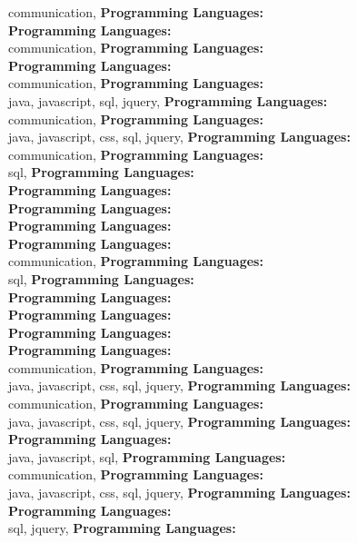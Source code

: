communication, \textbf{Programming Languages:} \\
\textbf{Programming Languages:} \\
communication, \textbf{Programming Languages:} \\
\textbf{Programming Languages:} \\
communication, \textbf{Programming Languages:} \\
java, javascript, sql, jquery, \textbf{Programming Languages:} \\
communication, \textbf{Programming Languages:} \\
java, javascript, css, sql, jquery, \textbf{Programming Languages:} \\
communication, \textbf{Programming Languages:} \\
sql, \textbf{Programming Languages:} \\
\textbf{Programming Languages:} \\
\textbf{Programming Languages:} \\
\textbf{Programming Languages:} \\
\textbf{Programming Languages:} \\
communication, \textbf{Programming Languages:} \\
sql, \textbf{Programming Languages:} \\
\textbf{Programming Languages:} \\
\textbf{Programming Languages:} \\
\textbf{Programming Languages:} \\
\textbf{Programming Languages:} \\
communication, \textbf{Programming Languages:} \\
java, javascript, css, sql, jquery, \textbf{Programming Languages:} \\
communication, \textbf{Programming Languages:} \\
java, javascript, css, sql, jquery, \textbf{Programming Languages:} \\
\textbf{Programming Languages:} \\
java, javascript, sql, \textbf{Programming Languages:} \\
communication, \textbf{Programming Languages:} \\
java, javascript, css, sql, jquery, \textbf{Programming Languages:} \\
\textbf{Programming Languages:} \\
sql, jquery, \textbf{Programming Languages:} \\
